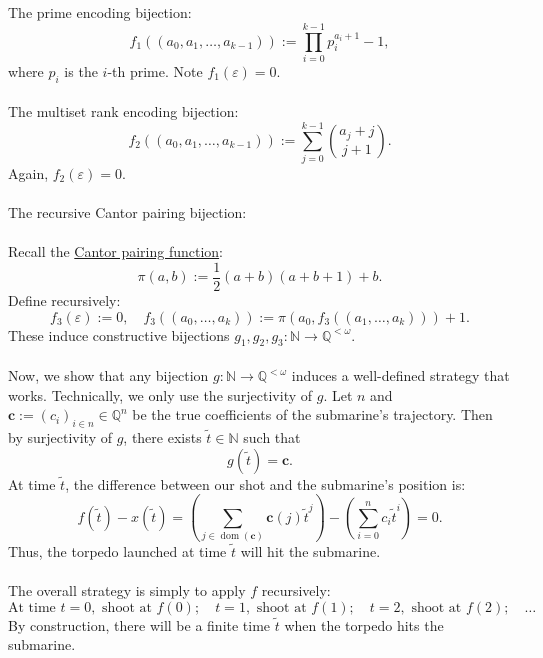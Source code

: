 \documentclass[11pt, a4paper, oneside]{article}
\theoremstyle{remark}
\theoremstyle{lemma}
\begin{document}
\\\\
The prime encoding bijection:
\[
f_1((a_0, a_1, \dots, a_{k-1})) := \prod_{i=0}^{k-1} p_i^{a_i + 1} - 1,
\]
where \(p_i\) is the \(i\)-th prime. Note \(f_1(\varepsilon) = 0\).
\\\\
The multiset rank encoding bijection:
\[
f_2((a_0, a_1, \dots, a_{k-1})) := \sum_{j=0}^{k-1} \binom{a_j + j}{j + 1}.
\]
Again, \(f_2(\varepsilon) = 0\).
\\\\
The recursive Cantor pairing bijection:
\\\\
Recall the \href{https://en.wikipedia.org/wiki/Pairing_function}{Cantor pairing function}:
\[
\pi(a, b) := \frac{1}{2}(a + b)(a + b + 1) + b.
\]
Define recursively:
\[
f_3(\varepsilon) := 0, \quad f_3((a_0, \dots, a_k)) := \pi(a_0, f_3((a_1, \dots, a_k))) + 1.
\]
These induce constructive bijections \(g_1, g_2, g_3: \mathbb{N} \to \mathbb{Q}^{<\omega}\).
\\\\
Now, we show that any bijection \(g: \mathbb{N} \to \mathbb{Q}^{<\omega}\) induces a well-defined strategy that works. Technically, we only use the surjectivity of \(g\). Let \(n\) and \(\mathbf{c} := (c_i)_{i \in n} \in \mathbb{Q}^n\) be the true coefficients of the submarine's trajectory. Then by surjectivity of \(g\), there exists \(\tilde{t} \in \mathbb{N}\) such that
\[
g(\tilde{t}) = \mathbf{c}.
\]
At time \(\tilde{t}\), the difference between our shot and the submarine’s position is:
\[
f(\tilde{t}) - x(\tilde{t}) = \left( \sum_{j \in \operatorname{dom}(\mathbf{c})} \mathbf{c}(j) \tilde{t}^j \right) - \left( \sum_{i = 0}^{n} c_i \tilde{t}^i \right) = 0.
\]
Thus, the torpedo launched at time \(\tilde{t}\) will hit the submarine.
\\\\
The overall strategy is simply to apply \(f\) recursively:
\[
\text{At time } t = 0, \text{ shoot at } f(0); \quad t = 1, \text{ shoot at } f(1); \quad t = 2, \text{ shoot at } f(2); \quad \dots
\]
By construction, there will be a finite time \(\tilde{t}\) when the torpedo hits the submarine.
\end{document}

